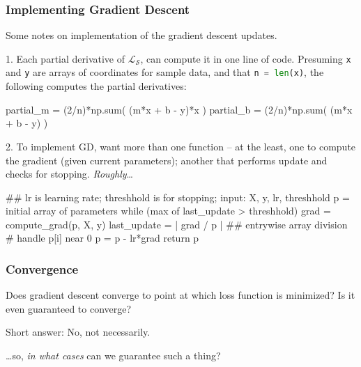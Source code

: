 \documentclass{beamer}
\newenvironment{codeblock}
    {\hfill\begin{beamerboxesrounded}[lower=codecol, width=0.8\textwidth]
    \medskip

    }
    { 
    \end{beamerboxesrounded}\hfill
    }
\theoremstyle{example}
\begin{document}
\begin{frame}[fragile]
    \frametitle{Implementing Gradient Descent}
    Some notes on implementation of the gradient descent updates.
    
    {\color{mygreen}1.} Each partial derivative of $\mathcal L_{\mathcal S}$, can compute it in one line of code. \pause Presuming \texttt{x} and \texttt{y} are arrays of coordinates for sample data, and that \lstinline[language=Python,basicstyle=\ttfamily,keywordstyle=\color{keywords}]{n = len(x)}, the following computes the partial derivatives:

\begin{codeblock}

\begin{python}
partial_m = (2/n)*np.sum( (m*x + b - y)*x )
partial_b = (2/n)*np.sum( (m*x + b - y) )
\end{python}

\end{codeblock}

    \pause
    {\color{mygreen}2.} To implement GD, want more than one function {--} at the least, one to compute the gradient (given current parameters); another that performs update and checks for stopping. \textit{Roughly}\ldots
\pause

\begin{pseudo}
## lr is learning rate; threshhold is for stopping;
input: X, y, lr, threshhold
p = initial array of parameters
while (max of last_update > threshhold){
    grad = compute_grad(p, X, y)
    last_update = | grad / p | ## entrywise array division
    # handle p[i] near 0
    p = p - lr*grad
}
return p
\end{pseudo}
\end{frame}

\begin{frame}
    \frametitle{Convergence}
    Does gradient descent converge to point at which loss function is minimized? Is it even guaranteed to converge?

    \pause
    Short answer: No, not necessarily. 

    \ldots so, \textit{in what cases} can we guarantee such a thing?


        \[\ \ \]
    
    \centering
\end{frame}
\end{document}
